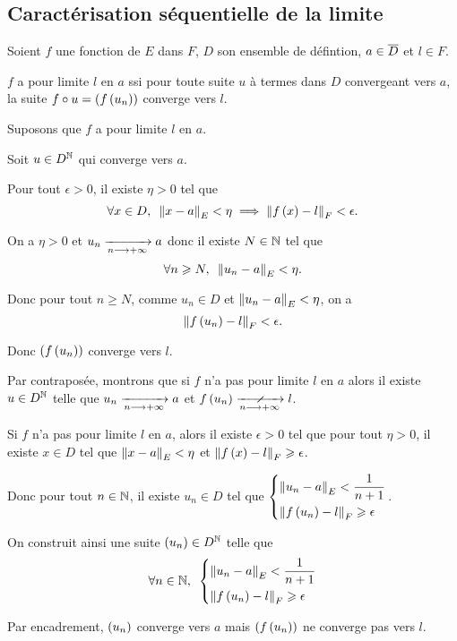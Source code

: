 \subsection{Caractérisation séquentielle de la limite}

\begin{theo}
Soient \(f\) une fonction de \(E\) dans \(F\), \(D\) son ensemble de défintion, \(a\in\overline{D}\) et \(l\in F\).

\(f\) a pour limite \(l\) en \(a\) ssi pour toute suite \(u\) à termes dans \(D\) convergeant vers \(a\), la suite \(f\circ u=\left(f\left(u_n\right)\right)\) converge vers \(l\).
\end{theo}

\begin{dem}
\impdir

Suposons que \(f\) a pour limite \(l\) en \(a\).

Soit \(u\in D^{\mathbb{N}}\) qui converge vers \(a\).

Pour tout \(\epsilon>0\), il existe \(\eta>0\) tel que \[\quantifs{\forall x\in D}\norme{x-a}_E<\eta\imp\norme{f\paren{x}-l}_F<\epsilon.\]

On a \(\eta>0\) et \(u_n\xrightarrow[n\longrightarrow+\infty]{}a\) donc il existe \(N\in\mathbb{N}\) tel que \[\quantifs{\forall n\geq N}\norme{u_n-a}_E<\eta.\]

Donc pour tout \(n\geq N\), comme \(u_n\in D\) et \(\norme{u_n-a}_E<\eta\), on a \[\norme{f\paren{u_n}-l}_F<\epsilon.\]

Donc \(\left(f\left(u_n\right)\right)\) converge vers \(l\).

\imprec

Par contraposée, montrons que si \(f\) n'a pas pour limite \(l\) en \(a\) alors il existe \(u\in D^{\mathbb{N}}\) telle que \(u_n\xrightarrow[n\longrightarrow+\infty]{}a\) et \(f\paren{u_n}\ntendqd{n\to\pinf}l\).

Si \(f\) n'a pas pour limite \(l\) en \(a\), alors il existe \(\epsilon>0\) tel que pour tout \(\eta>0\), il existe \(x\in D\) tel que \(\norme{x-a}_E<\eta\) et \(\norme{f\paren{x}-l}_F\geq\epsilon\).

Donc pour tout \(n\in\mathbb{N}\), il existe \(u_n\in D\) tel que \(\begin{dcases}
\norme{u_n-a}_E<\dfrac{1}{n+1} \\
\norme{f\paren{u_n}-l}_F\geq\epsilon
\end{dcases}\).

On construit ainsi une suite \(\left(u_n\right)\in D^{\mathbb{N}}\) telle que \[\quantifs{\forall n\in\N}\begin{dcases}
\norme{u_n-a}_E<\dfrac{1}{n+1} \\
\norme{f\paren{u_n}-l}_F\geq\epsilon
\end{dcases}\]

Par encadrement, \(\left(u_n\right)\) converge vers \(a\) mais \(\left(f\left(u_n\right)\right)\) ne converge pas vers \(l\).
\end{dem}

